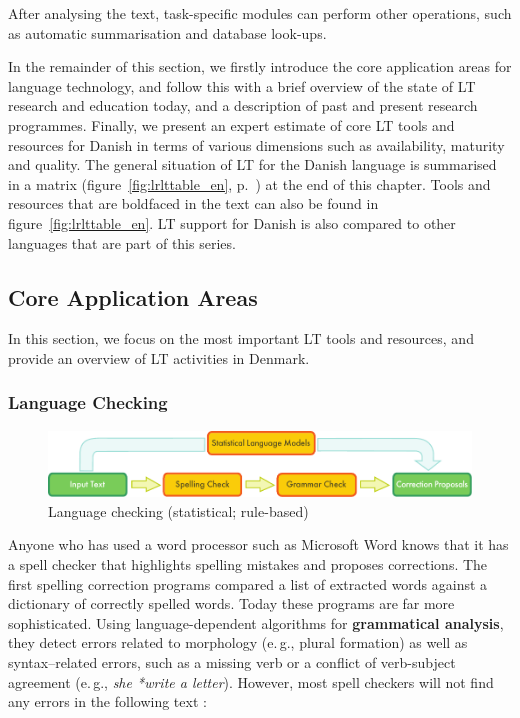 \begin{multicols}{2}
After analysing the text, task-specific modules can perform other operations, such as automatic summarisation and database look-ups.

In the remainder of this section, we firstly introduce the core application areas for language technology, and follow this with a brief overview of the state of LT research and education today, and a description of past and present research programmes. Finally, we present an expert estimate of core LT tools and resources for Danish in terms of various dimensions such as availability, maturity and quality. The general situation of LT for the Danish language is summarised in a matrix (figure~\ref{fig:lrlttable_en}, p.~\pageref{fig:lrlttable_en}) at the end of this chapter. Tools and resources that are boldfaced in the text can also be found in figure~\ref{fig:lrlttable_en}. LT support for Danish is also compared to other languages that are part of this series.

\subsection{Core Application Areas}

In this section, we focus on the most important LT tools and resources, and provide an overview of LT activities in Denmark. 

\subsubsection{Language Checking}

\begin{figure}[th]
  \center
  \includegraphics[width=\textwidth]{../_media/english/language_checking}
  \caption{Language checking (statistical; rule-based)}
\label{fig:langcheckingaarch_en}
\end{figure}

Anyone who has used a word processor such as Microsoft Word knows that it has a spell checker that highlights spelling mistakes and proposes corrections. The first spelling correction programs compared a list of extracted words against a dictionary of correctly spelled words. Today these programs are far more sophisticated. Using language-dependent algorithms for \textbf{grammatical analysis}, they detect errors related to morphology (e.\,g., plural formation) as well as syntax–related errors, such as a missing verb or a conflict of verb-subject agreement (e.\,g., \textit{she *write a letter}). However, most spell checkers will not find any errors in the following text \cite{zar1}:


\end{multicols}
